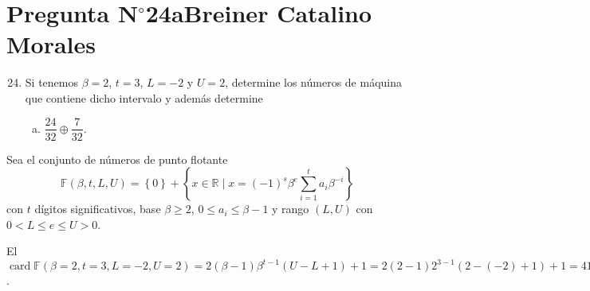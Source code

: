 \section{Pregunta N$^{\circ}$24a\qquad Breiner Catalino Morales}

\begin{frame}
	\begin{enumerate}\setcounter{enumi}{23}
		\item

		      Si tenemos $\beta=2$, $t=3$, $L=-2$ y $U=2$, determine los
		      números de máquina que contiene dicho intervalo y además
		      determine

		      \begin{enumerate}[b)]
			      \item

			            \begin{math}
				            \dfrac{24}{32}\oplus
				            \dfrac{7}{32}
			            \end{math}.
		      \end{enumerate}
	\end{enumerate}

	\begin{solution}
		\begin{definition}
			Sea el \alert{conjunto de números de punto flotante}
			\begin{equation*}
				\mathbb{F}\left(\beta,t,L,U\right)=
				\left\{0\right\}+
				\left\{
				x\in\mathbb{R}\mid
				x=
				\left(-1\right)^{s}
				\beta^{e}
				\sum_{i=1}^{t}a_{i}\beta^{-i}
				\right\}
			\end{equation*}
			con $t$ dígitos significativos, base $\beta\geq2$,
			$0\leq a_{i}\leq\beta-1$ y rango $\left(L,U\right)$ con
			$0<L\leq e\leq U>0$.
		\end{definition}

		El
		\begin{math}
			\operatorname{card}\mathbb{F}\left(\beta=2,t=3,L=-2,U=2\right)=
			2\left(\beta-1\right)\beta^{t-1}\left(U-L+1\right)+1=
			2\left(2-1\right)2^{3-1}\left(2-\left(-2\right)+1\right)+1=
			41
		\end{math}.
	\end{solution}
\end{frame}

